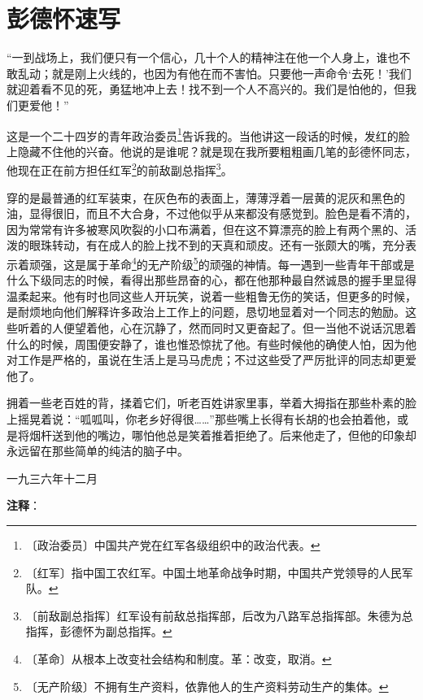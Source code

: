 \documentclass[12pt,UTF-8,openany]{ctexbook}
\begin{document}
\chapter{彭德怀速写}

\begin{large}
    
    “一到战场上，我们便只有一个信心，几十个人的精神注在他一个人身上，谁也不敢乱动；就是刚上火线的，也因为有他在而不害怕。只要他一声命令‘去死！’我们就迎着看不见的死，勇猛地冲上去！找不到一个人不高兴的。我们是怕他的，但我们更爱他！”
    
    这是一个二十四岁的青年政治委员\footnote{〔政治委员〕中国共产党在红军各级组织中的政治代表。}告诉我的。当他讲这一段话的时候，发红的脸上隐藏不住他的兴奋。他说的是谁呢？就是现在我所要粗粗画几笔的彭德怀同志，他现在正在前方担任红军\footnote{〔红军〕指中国工农红军。中国土地革命战争时期，中国共产党领导的人民军队。}的前敌副总指挥\footnote{〔前敌副总指挥〕红军设有前敌总指挥部，后改为八路军总指挥部。朱德为总指挥，彭德怀为副总指挥。}。
    
    穿的是最普通的红军装束，在灰色布的表面上，薄薄浮着一层黄的泥灰和黑色的油，显得很旧，而且不大合身，不过他似乎从来都没有感觉到。脸色是看不清的，因为常常有许多被寒风吹裂的小口布满着，但在这不算漂亮的脸上有两个黑的、活泼的眼珠转动，有在成人的脸上找不到的天真和顽皮。还有一张颇大的嘴，充分表示着顽强，这是属于革命\footnote{〔革命〕从根本上改变社会结构和制度。革：改变，取消。}的无产阶级\footnote{〔无产阶级〕不拥有生产资料，依靠他人的生产资料劳动生产的集体。}的顽强的神情。每一遇到一些青年干部或是什么下级同志的时候，看得出那些昂奋的心，都在他那种最自然诚恳的握手里显得温柔起来。他有时也同这些人开玩笑，说着一些粗鲁无伤的笑话，但更多的时候，是耐烦地向他们解释许多政治上工作上的问题，恳切地显着对一个同志的勉励。这些听着的人便望着他，心在沉静了，然而同时又更奋起了。但一当他不说话沉思着什么的时候，周围便安静了，谁也惟恐惊扰了他。有些时候他的确使人怕，因为他对工作是严格的，虽说在生活上是马马虎虎；不过这些受了严厉批评的同志却更爱他了。
    
    拥着一些老百姓的背，揉着它们，听老百姓讲家里事，举着大拇指在那些朴素的脸上摇晃着说：“呱呱叫，你老乡好得很……”那些嘴上长得有长胡的也会拍着他，或是将烟杆送到他的嘴边，哪怕他总是笑着推着拒绝了。后来他走了，但他的印象却永远留在那些简单的纯洁的脑子中。
    
    \hfill 一九三六年十二月
    
\end{large}


\newpage

\textbf{注释}：
\end{document}

